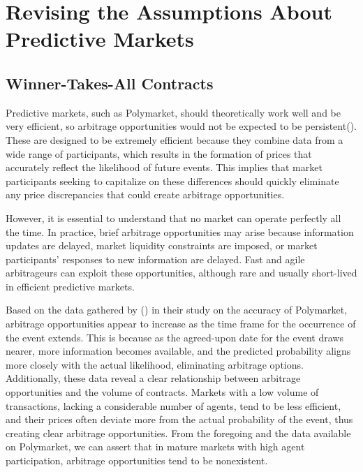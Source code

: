 \section{Revising the Assumptions About Predictive Markets}
\label{sec:revising_assumptions}

\subsection{Winner-Takes-All Contracts}
\label{subsec:winner_takes_all_contracts}

Predictive markets, such as Polymarket, should theoretically work well and be very efficient, so arbitrage opportunities would not be expected to be persistent(\citeauthor{luckner2008arbitrage}). These are designed to be extremely efficient because they combine data from a wide range of participants, which results in the formation of prices that accurately reflect the likelihood of future events. This implies that market participants seeking to capitalize on these differences should quickly eliminate any price discrepancies that could create arbitrage opportunities.

However, it is essential to understand that no market can operate perfectly all the time. In practice, brief arbitrage opportunities may arise because information updates are delayed, market liquidity constraints are imposed, or market participants' responses to new information are delayed. Fast and agile arbitrageurs can exploit these opportunities, although rare and usually short-lived in efficient predictive markets.

Based on the data gathered by (\citeauthor{kapp2023improved}) in their study on the accuracy of Polymarket, arbitrage opportunities appear to increase as the time frame for the occurrence of the event extends. This is because as the agreed-upon date for the event draws nearer, more information becomes available, and the predicted probability aligns more closely with the actual likelihood, eliminating arbitrage options. Additionally, these data reveal a clear relationship between arbitrage opportunities and the volume of contracts. Markets with a low volume of transactions, lacking a considerable number of agents, tend to be less efficient, and their prices often deviate more from the actual probability of the event, thus creating clear arbitrage opportunities. From the foregoing and the data available on Polymarket, we can assert that in mature markets with high agent participation, arbitrage opportunities tend to be nonexistent.

